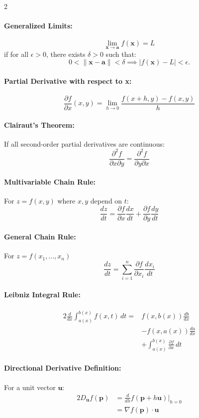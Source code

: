 \begin{multicols}{2}
\paragraph{Generalized Limits:}
\[
\lim_{\mathbf{x} \to \mathbf{a}} f(\mathbf{x}) = L
\]
if for all \( \epsilon > 0 \), there exists \( \delta > 0 \) such that:
\[
0 < \|\mathbf{x} - \mathbf{a}\| < \delta \implies |f(\mathbf{x}) - L| < \epsilon.
\]
\paragraph{Partial Derivative with respect to x:}
\[
\frac{\partial f}{\partial x}(x, y) = \lim_{h \to 0} \frac{f(x + h, y) - f(x, y)}{h}
\]
\paragraph{Clairaut's Theorem:}
If all second-order partial derivatives are continuous:
\[
\frac{\partial^2 f}{\partial x \partial y} = \frac{\partial^2 f}{\partial y \partial x}
\]
\paragraph{Multivariable Chain Rule:}
For $z = f(x,y)$ where $x,y$ depend on $t$:
\[
\frac{dz}{dt} = \frac{\partial f}{\partial x} \frac{dx}{dt} + \frac{\partial f}{\partial y} \frac{dy}{dt}
\]
\paragraph{General Chain Rule:}
For $z = f(x_1,...,x_n)$
\[
\frac{dz}{dt} = \sum_{i=1}^n \frac{\partial f}{\partial x_i} \frac{dx_i}{dt}
\]
\paragraph{Leibniz Integral Rule:}
\begin{alignat*}{2}
\frac{d}{dx}\int_{a(x)}^{b(x)} f(x,t)\,dt = &f(x,b(x))\frac{db}{dx} \\
&- f(x,a(x))\frac{da}{dx} \\
&+ \int_{a(x)}^{b(x)} \frac{\partial f}{\partial x}\,dt
\end{alignat*}

\paragraph{Directional Derivative Definition:}
For a unit vector \(\mathbf{u}\):
\begin{alignat*}{2}
D_{\mathbf{u}} f(\mathbf{p}) &= \frac{d}{dh} f(\mathbf{p} + h \mathbf{u}) \bigg|_{h=0} \\
&= \nabla f(\mathbf{p}) \cdot \mathbf{u}
\end{alignat*}


\end{multicols}

